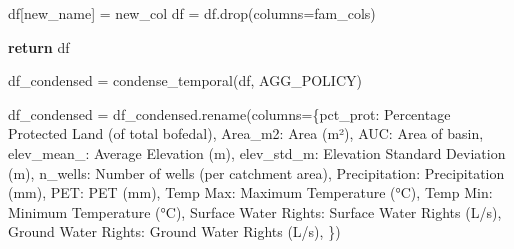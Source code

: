 \documentclass[
  letterpaper,
  DIV=11,
  numbers=noendperiod]{scrreprt}
\newenvironment{Shaded}{\begin{snugshade}}{\end{snugshade}}
\newcommand{\ControlFlowTok}[1]{\textcolor[rgb]{0.00,0.23,0.31}{\textbf{#1}}}
\newcommand{\NormalTok}[1]{\textcolor[rgb]{0.00,0.23,0.31}{#1}}
\newcommand{\OperatorTok}[1]{\textcolor[rgb]{0.37,0.37,0.37}{#1}}
\newcommand{\StringTok}[1]{\textcolor[rgb]{0.13,0.47,0.30}{#1}}
\begin{document}
\begin{Shaded}
\begin{Highlighting}[]
\NormalTok{        df[new\_name] }\OperatorTok{=}\NormalTok{ new\_col}
\NormalTok{        df }\OperatorTok{=}\NormalTok{ df.drop(columns}\OperatorTok{=}\NormalTok{fam\_cols)}

    \ControlFlowTok{return}\NormalTok{ df}
\end{Highlighting}
\end{Shaded}

\begin{Shaded}
\begin{Highlighting}[]
\NormalTok{df\_condensed }\OperatorTok{=}\NormalTok{ condense\_temporal(df, AGG\_POLICY)}

\NormalTok{df\_condensed }\OperatorTok{=}\NormalTok{ df\_condensed.rename(columns}\OperatorTok{=}\NormalTok{\{}\StringTok{\textquotesingle{}pct\_prot\textquotesingle{}}\NormalTok{: }\StringTok{\textquotesingle{}Percentage Protected Land (of total bofedal)\textquotesingle{}}\NormalTok{, }
                        \StringTok{\textquotesingle{}Area\_m2\textquotesingle{}}\NormalTok{: }\StringTok{\textquotesingle{}Area (m²)\textquotesingle{}}\NormalTok{, }
                        \StringTok{\textquotesingle{}AUC\textquotesingle{}}\NormalTok{: }\StringTok{\textquotesingle{}Area of basin\textquotesingle{}}\NormalTok{, }
                        \StringTok{\textquotesingle{}elev\_mean\_\textquotesingle{}}\NormalTok{: }\StringTok{\textquotesingle{}Average Elevation (m)\textquotesingle{}}\NormalTok{,}
                        \StringTok{\textquotesingle{}elev\_std\_m\textquotesingle{}}\NormalTok{: }\StringTok{\textquotesingle{}Elevation Standard Deviation (m)\textquotesingle{}}\NormalTok{,}
                        \StringTok{\textquotesingle{}n\_wells\textquotesingle{}}\NormalTok{: }\StringTok{\textquotesingle{}Number of wells (per catchment area)\textquotesingle{}}\NormalTok{,}
                        \StringTok{\textquotesingle{}Precipitation\textquotesingle{}}\NormalTok{: }\StringTok{\textquotesingle{}Precipitation (mm)\textquotesingle{}}\NormalTok{,}
                        \StringTok{\textquotesingle{}PET\textquotesingle{}}\NormalTok{: }\StringTok{\textquotesingle{}PET (mm)\textquotesingle{}}\NormalTok{,}
                        \StringTok{\textquotesingle{}Temp Max\textquotesingle{}}\NormalTok{: }\StringTok{\textquotesingle{}Maximum Temperature (°C)\textquotesingle{}}\NormalTok{,}
                        \StringTok{\textquotesingle{}Temp Min\textquotesingle{}}\NormalTok{: }\StringTok{\textquotesingle{}Minimum Temperature (°C)\textquotesingle{}}\NormalTok{,}
                        \StringTok{\textquotesingle{}Surface Water Rights\textquotesingle{}}\NormalTok{: }\StringTok{\textquotesingle{}Surface Water Rights (L/s)\textquotesingle{}}\NormalTok{,}
                        \StringTok{\textquotesingle{}Ground Water Rights\textquotesingle{}}\NormalTok{: }\StringTok{\textquotesingle{}Ground Water Rights (L/s)\textquotesingle{}}\NormalTok{,}
\NormalTok{                    \})}


\end{Highlighting}
\end{Shaded}
\end{document}
